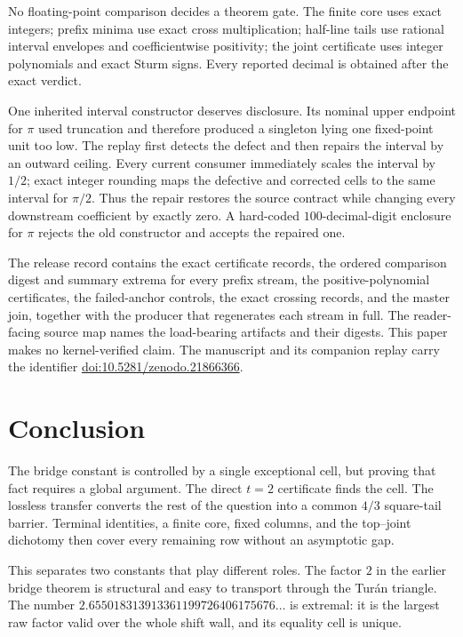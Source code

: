 \documentclass[11pt,a4paper]{article}
\theoremstyle{plain}
\theoremstyle{remark}
\begin{document}
No floating-point comparison decides a theorem gate.  The finite core uses
exact integers; prefix minima use exact cross multiplication; half-line tails
use rational interval envelopes and coefficientwise positivity; the joint
certificate uses integer polynomials and exact Sturm signs.  Every reported
decimal is obtained after the exact verdict.

One inherited interval constructor deserves disclosure.  Its nominal upper
endpoint for $\pi$ used truncation and therefore produced a singleton lying one
fixed-point unit too low.  The replay first detects the defect and then repairs
the interval by an outward ceiling.  Every current consumer immediately scales
the interval by $1/2$; exact integer rounding maps the defective and corrected
cells to the same interval for $\pi/2$.  Thus the repair restores the source
contract while changing every downstream coefficient by exactly zero.  A
hard-coded $100$-decimal-digit enclosure for $\pi$ rejects the old constructor
and accepts the repaired one.

The release record contains the exact certificate records, the ordered
comparison digest and summary extrema for every prefix stream, the
positive-polynomial certificates, the failed-anchor controls, the exact
crossing records, and the master join, together with the producer that
regenerates each stream in full.  The reader-facing source map names the
load-bearing artifacts and their digests.  This paper makes no kernel-verified
claim.  The manuscript and its companion replay carry the identifier
\href{https://doi.org/10.5281/zenodo.21866366}{doi:10.5281/zenodo.21866366}.

\section{Conclusion}

The bridge constant is controlled by a single exceptional cell, but proving
that fact requires a global argument.  The direct $t=2$ certificate finds the
cell.  The lossless transfer converts the rest of the question into a common
$4/3$ square-tail barrier.  Terminal identities, a finite core, fixed columns,
and the top--joint dichotomy then cover every remaining row without an
asymptotic gap.

This separates two constants that play different roles.  The factor $2$ in
the earlier bridge theorem is structural and easy to transport through the
Tur\'an triangle.  The number
$2.655018313913361199726406175676\ldots$ is extremal: it is the largest raw
factor valid over the whole shift wall, and its equality cell is unique.
\end{document}
